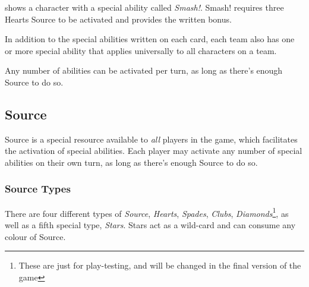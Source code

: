  shows a character with a special ability called \textit{Smash!}.
Smash! requires three Hearts Source to be activated and provides the written bonus.

In addition to the special abilities written on each card, each team also has one or more special ability that applies universally to all characters on a team.

\begin{note} 
    Any number of abilities can be activated per turn, as long as there's enough Source to do so.
\end{note}
\subsection{Source}
Source is a special resource available to \textit{all} players in the game, which facilitates the activation of special abilities.
Each player may activate any number of special abilities on their own turn, as long as there's enough Source to do so.

\subsubsection{Source Types}
There are four different types of \textit{Source}, \textit{Hearts}, \textit{Spades}, \textit{Clubs}, \textit{Diamonds}\footnote{These are just for play-testing, and will be changed in the final version of the game}, as well as a fifth special type, \textit{Stars}.
Stars act as a wild-card and can consume any colour of Source.


